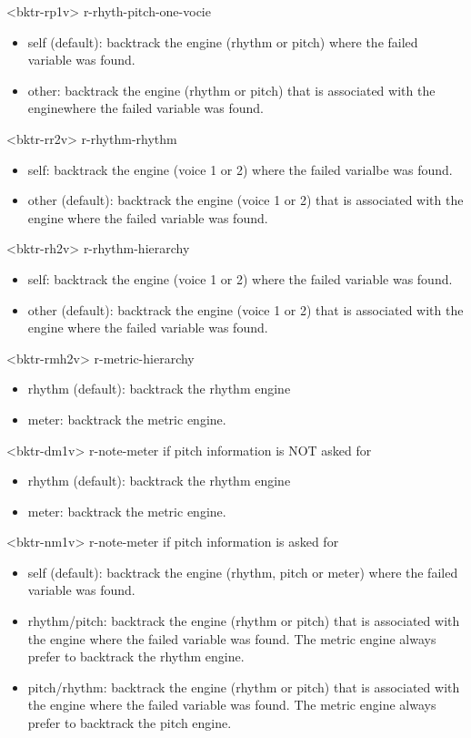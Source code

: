 \begin{description}
<bktr-rp1v>  r-rhyth-pitch-one-vocie
\begin{itemize}
\item self (default): backtrack the engine (rhythm or pitch) where the failed variable was found.
\item other: backtrack the engine (rhythm or pitch) that is associated with the enginewhere the failed variable was found.
\end{itemize}
<bktr-rr2v> r-rhythm-rhythm
\begin{itemize}
\item self: backtrack the engine (voice 1 or 2) where the failed varialbe was found.
\item other (default): backtrack the engine (voice 1 or 2) that is associated with the engine where the failed variable was found.
\end{itemize}
<bktr-rh2v> r-rhythm-hierarchy
\begin{itemize}
\item self: backtrack the engine (voice 1 or 2) where the failed variable was found.
\item other (default): backtrack the engine (voice 1 or 2) that is associated with the engine where the failed variable was found.
\end{itemize}
<bktr-rmh2v> r-metric-hierarchy
\begin{itemize}
\item rhythm (default): backtrack the rhythm engine
\item meter: backtrack the metric engine.
\end{itemize}
<bktr-dm1v> r-note-meter if pitch information is NOT asked for
\begin{itemize}
\item rhythm (default): backtrack the rhythm engine
\item meter: backtrack the metric engine.
\end{itemize}
<bktr-nm1v> r-note-meter if pitch information is asked for
\begin{itemize}
\item self (default): backtrack the engine (rhythm, pitch or meter) where the failed variable was found.
\item rhythm/pitch: backtrack the engine (rhythm or pitch) that is associated with the engine where the failed variable was found. The metric engine always prefer to backtrack the rhythm engine.
\item pitch/rhythm: backtrack the engine (rhythm or pitch) that is associated with the engine where the failed variable was found. The metric engine always prefer to backtrack the pitch engine.

\end{itemize}
\end{description}
